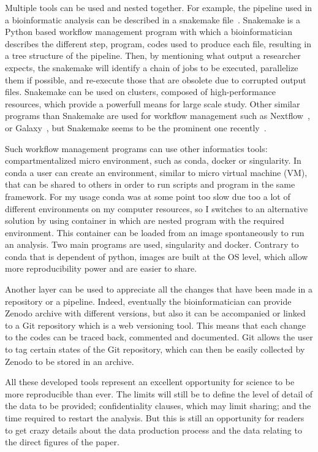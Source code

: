 Multiple tools can be used and nested together. For example, the pipeline used in a bioinformatic analysis can be described in a snakemake file~\citep{koster_snakemakescalable_2012}. Snakemake is a Python based workflow management program with which a bioinformatician describes the different step, program, codes used to produce each file, resulting in a tree structure of the pipeline. Then, by mentioning what output a researcher expects, the snakemake will identify a chain of jobs to be executed, parallelize them if possible, and re-execute those that are obsolete due to corrupted output files. Snakemake can be used on clusters, composed of high-performance resources, which provide a powerfull means for large scale study. Other similar programs than Snakemake are used for workflow management such as Nextflow~\citep{di_tommaso_nextflow_2017}, or Galaxy~\citep{galaxy_community_galaxy_2022}, but Snakemake seems to be the prominent one recently~\citep{cokelaer_reprohackathons_2023}.

Such workflow management programs can use other informatics tools: compartmentalized micro environment, such as conda, docker or singularity. In conda a user can create an environment, similar to micro virtual machine (VM), that can be shared to others in order to run scripts and program in the same framework. For my usage conda was at some point too slow due too a lot of different environments on my computer resources, so I switches to an alternative solution by using container in which are nested program with the required environment. This container can be loaded from an image spontaneously to run an analysis. Two main programs are used, singularity and docker. Contrary to conda that is dependent of python, images are built at the OS level, which allow more reproducibility power and are easier to share.

Another layer can be used to appreciate all the changes that have been made in a repository or a pipeline. Indeed, eventually the bioinformatician can provide Zenodo archive with different versions, but also it can be accompanied or linked to a Git repository which is a web versioning tool. This means that each change to the codes can be traced back, commented and documented. Git allows the user to tag certain states of the Git repository, which can then be easily collected by Zenodo to be stored in an archive.

All these developed tools represent an excellent opportunity for science to be more reproducible than ever. The limits will still be to define the level of detail of the data to be provided; confidentiality clauses, which may limit sharing; and the time required to restart the analysis. But this is still an opportunity for readers to get crazy details about the data production process and the data relating to the direct figures of the paper. 

